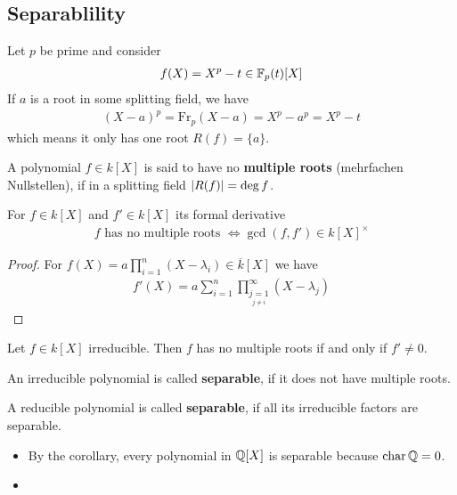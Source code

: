 \subsection{Separablility}
Let $p$ be prime and consider
\begin{align*}
  f(X) = X^{p} - t \in \mathbb{F}_p(t)[X]
\end{align*}
If $a$ is a root in some splitting field, we have
\begin{align*}
  (X - a)^{p} = \text{Fr}_p(X-a) = X^{p} - a^{p} = X^{p} -t
\end{align*}
which means it only has one root $R(f) = \{a\}$.


\begin{dfn}[]
  A polynomial $f \in k[X]$ is said to have no \textbf{multiple roots} (mehrfachen Nullstellen), if in a splitting field $\vert R(f)\vert = \operatorname{deg} f$.
\end{dfn}


\begin{lem}[]
  For $f \in k[X]$ and $f'\in k[X]$ its formal derivative
  \begin{align*}
    f \text{ has no multiple roots } \iff \gcd(f,f') \in k[X]^{\times}
  \end{align*}
\end{lem}
\begin{proof}
  For $f(X) = a \prod_{i=1}^{n}(X - \lambda_i) \in \overline{k}[X]$ we have
  \begin{align*}
    f'(X) = a \sum_{i=1}^{n} \prod_{\underset{j\neq i}{j = 1}}^{\infty} (X - \lambda_j)
  \end{align*}
\end{proof}
\begin{cor}[]
  Let $f \in k[X]$ irreducible.
  Then $f$ has no multiple roots if and only if $f' \neq 0$.
\end{cor}

\begin{dfn}[]
An irreducible polynomial is called \textbf{separable}, if it does not have multiple roots.

A reducible polynomial is called \textbf{separable}, if all its irreducible factors are separable.

\end{dfn}

\begin{itemize}
  \item By the corollary, every polynomial in $\mathbb{Q}[X]$ is separable because $\operatorname{char} \mathbb{Q} = 0$.
  \item 
\end{itemize}


